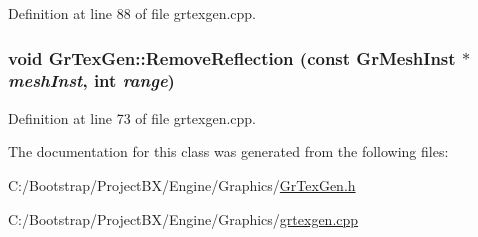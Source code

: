Definition at line 88 of file grtexgen.cpp.\hypertarget{class_gr_tex_gen_9bab9a898273d7d9a305af9cf9846796}{
\subsubsection[{RemoveReflection}]{\setlength{\rightskip}{0pt plus 5cm}void GrTexGen::RemoveReflection (const {\bf GrMeshInst} $\ast$ {\em meshInst}, \/  int {\em range})}}
\label{class_gr_tex_gen_9bab9a898273d7d9a305af9cf9846796}




Definition at line 73 of file grtexgen.cpp.

The documentation for this class was generated from the following files:\begin{CompactItemize}
\item 
C:/Bootstrap/ProjectBX/Engine/Graphics/\hyperlink{_gr_tex_gen_8h}{GrTexGen.h}\item 
C:/Bootstrap/ProjectBX/Engine/Graphics/\hyperlink{grtexgen_8cpp}{grtexgen.cpp}\end{CompactItemize}
